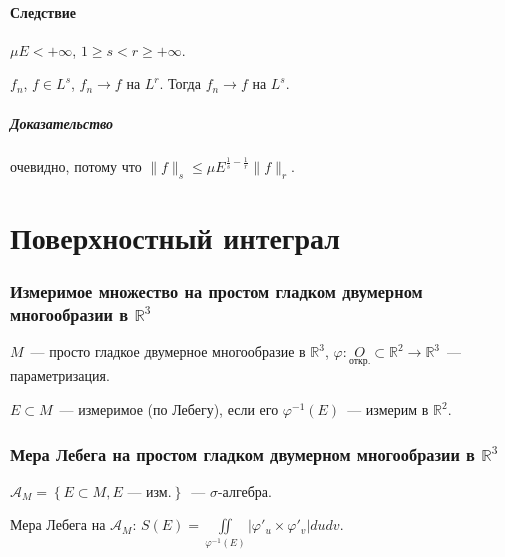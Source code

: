 \documentclass{article}
\begin{document}
        \subsection{Следствие}
        
            $\mu E < +\infty$, $1 \geqslant s < r \geqslant +\infty$.
            
            $f_n$, $f \in L^s$, $f_n \rightarrow f$ на $L^r$. Тогда $f_n \rightarrow f$ на $L^s$.
            
        \subsubsection{Доказательство}
        
            очевидно, потому что $\| f \|_s \leqslant \mu E^{\frac{1}{s} - \frac{1}{r}} \| f \|_r$.

\newpage

\part{Поверхностный интеграл}

    \section{Измеримое множество на простом гладком двумерном многообразии в $\mathbb{R}^3$}
    
        $M$~--- просто гладкое двумерное многообразие в $\mathbb{R}^3$, $\varphi : \underset{\text{откр.}}{O} \subset \mathbb{R}^2 \rightarrow \mathbb{R}^3$~--- параметризация.
        
        $E \subset M$~--- измеримое (по Лебегу), если его $\varphi^{-1}(E)$~--- измерим в $\mathbb{R}^2$.
        
    \newpage
    
    \section{Мера Лебега на простом гладком двумерном многообразии в $\mathbb{R}^3$}
    
        $\mathcal{A}_M = \left\{ E \subset M, E \text{~--- изм.} \right\}$~--- $\sigma$-алгебра.
        
        Мера Лебега на $\mathcal{A}_M$: $S(E) = \iint\limits_{\varphi^{-1}(E)} \left| \varphi'_u \times \varphi'_v \right| du dv$.
             
    \newpage
        
\end{document}
